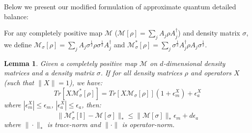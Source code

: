 \documentclass[aps,floatfix,10pt,amssymb,amsfont,amsmath,superscriptaddress,float,nofootinbib,longbibliography,nobalancelastpage,twocolumn]{revtex4-2}
\newtheorem{lemma}{Lemma}
\begin{document}
Below we present our modified formulation of approximate quantum detailed balance:

For any completely positive map $\mathcal{M}$ ($\mathcal{M}[\rho] =\sum_{j}  A_{j}\rho  A^{\dagger}_{j}$) and density matrix $\sigma$, we define $\mathcal{M}_{\sigma}[\rho] =\sum_{j}  A_{j}\sigma^{\frac{1}{2}}\rho\sigma^{\frac{1}{2}}  A^{\dagger}_{j}$ and $ \mathcal{M}^*_{\sigma}[\rho] = \sum_{j} \sigma^{\frac{1}{2}}A^{\dagger}_{j}\rho A_{j}\sigma^{\frac{1}{2}}$.
\begin{lemma}
\label{lemma:1}
Given a completely positive map $\mathcal{M}$ on $d$-dimensional density matrices and a density matrix $\sigma$.  If for all density matrices $\rho$ and operators $X$ (such that $\|X\|=1$), we have:
\begin{equation}
    Tr\left[X \mathcal{M}^*_{\sigma}[\rho]\right] = Tr\left[X\mathcal{M}_{\sigma}[\rho]\right](1+\epsilon^{X}_m) + \epsilon^{X}_a
    \label{eq:approximate_quantum_detailed_balance_condition}
\end{equation}
where $|\epsilon^{X}_m| \leq \epsilon_m$, $|\epsilon^{X}_a| \leq \epsilon_a$, then:
 \begin{equation}
    \|\mathcal{M}^*_{\sigma}[\mathbb{I}]-\mathcal{M}[\sigma] \|_* \leq \|\mathcal{M}[\sigma]\|_*\epsilon_m + d\epsilon_a
\end{equation}
where $\|\cdot\|_*$ is trace-norm and $\|\cdot\|$ is operator-norm.
\end{lemma}
\end{document}

